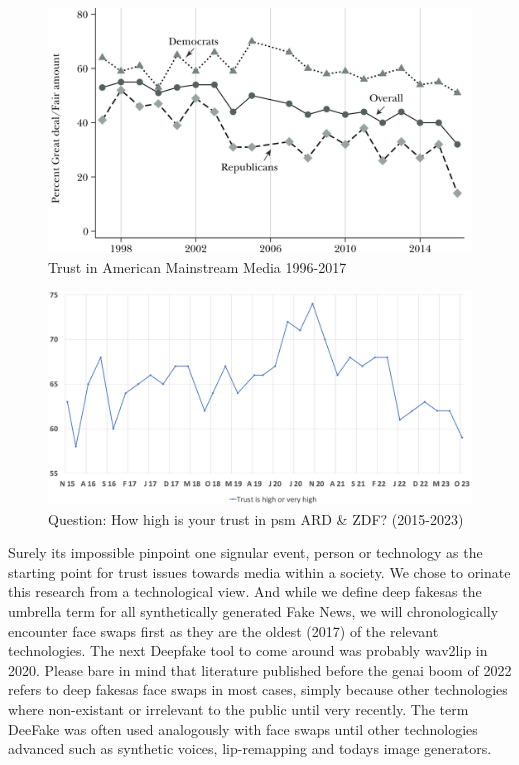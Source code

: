 \documentclass[
  a4paper,  %
  twoside,  %
  bibliography=totoc,
  headsepline,
  cleardoublepage=empty,
  parskip=half,
  draft=false
]{scrbook}
\begin{document}
\begin{figure}[h]
  \centering
  \centering
  \includegraphics[width=0.75\linewidth]{./graphics/images/trust-america mainstream.png}
  \caption{Trust in American Mainstream Media 1996-2017 \cite{allcottSocialMediaFake2017}}
  \label{fig:trust-us}
\end{figure}
\begin{figure}[h]
  \centering
  \includegraphics[width=0.8\linewidth]{./graphics/images/FGW-Trust-in-ARDZDF.png}
  \caption{Question: How high is your trust in \gls{psm} ARD \& ZDF? (2015-2023) \cite{zdf-politbarometerVertrauenGlaubwuerdigkeitBerichterstattung2023}}
  \label{fig:trust-ger}
\end{figure}

Surely its impossible pinpoint one signular event, person or technology as the starting point for trust issues towards media within a society. We chose to orinate this research from a technological view. And while we define deep fakesas the umbrella term for all synthetically generated Fake News, we will chronologically encounter face swaps first as they are the oldest (2017) of the relevant technologies. The next Deepfake tool to come around was probably wav2lip in 2020. Please bare in mind that literature published before the \gls{genai} boom of 2022 refers to deep fakesas face swaps in most cases, simply because other technologies where non-existant or irrelevant to the public until very recently. The term DeeFake was often used analogously with face swaps until other technologies advanced such as synthetic voices, lip-remapping and todays image generators.
\end{document}
